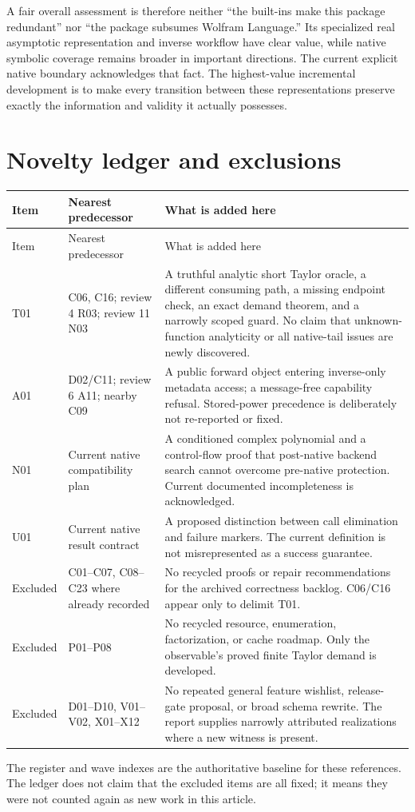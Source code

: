 \documentclass[11pt,letterpaper]{article}
\theoremstyle{definition}\newtheorem{definition}[proposition]{Definition}
\begin{document}
A fair overall assessment is therefore neither ``the built-ins make this
package redundant'' nor ``the package subsumes Wolfram Language.'' Its
specialized real asymptotic representation and inverse workflow have clear
value, while native symbolic coverage remains broader in important directions.
The current explicit native boundary acknowledges that fact. The highest-value
incremental development is to make every transition between these representations
preserve exactly the information and validity it actually possesses.

\appendix
\section{Novelty ledger and exclusions}
\begin{longtable}{@{}P{0.68in}P{1.3in}P{4.32in}@{}}
\toprule
Item & Nearest predecessor & What is added here\\\midrule
\endfirsthead
\toprule Item & Nearest predecessor & What is added here\\\midrule
\endhead
T01 & C06, C16; review 4 R03; review 11 N03 & A truthful analytic short Taylor oracle, a different consuming path, a missing endpoint check, an exact demand theorem, and a narrowly scoped guard. No claim that unknown-function analyticity or all native-tail issues are newly discovered.\\
A01 & D02/C11; review 6 A11; nearby C09 & A public forward object entering inverse-only metadata access; a message-free capability refusal. Stored-power precedence is deliberately not re-reported or fixed.\\
N01 & Current native compatibility plan & A conditioned complex polynomial and a control-flow proof that post-native backend search cannot overcome pre-native protection. Current documented incompleteness is acknowledged.\\
U01 & Current native result contract & A proposed distinction between call elimination and failure markers. The current  definition is not misrepresented as a success guarantee.\\
Excluded & C01--C07, C08--C23 where already recorded & No recycled proofs or repair recommendations for the archived correctness backlog. C06/C16 appear only to delimit T01.\\
Excluded & P01--P08 & No recycled resource, enumeration, factorization, or cache roadmap. Only the observable's proved finite Taylor demand is developed.\\
Excluded & D01--D10, V01--V02, X01--X12 & No repeated general feature wishlist, release-gate proposal, or broad schema rewrite. The report supplies narrowly attributed realizations where a new witness is present.\\
\bottomrule
\end{longtable}
The register and wave indexes are the authoritative baseline for these
references. The ledger does not claim that the excluded items are all fixed;
it means they were not counted again as new work in this article.
\cite{register,wave1,wave2,review4,review6,review11}
\end{document}
